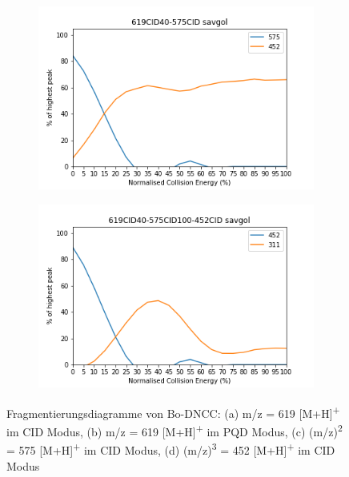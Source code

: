 \begin{figure}[!htbp]
  \begin{subfigure}[b]{0.5\textwidth}
    \includegraphics[width=\textwidth]{content/Anhang/ESIMS/Bo-DNCC/619CID40-575CID-575savgol.png}
    \caption{}
  \end{subfigure}
  \hfill
  \begin{subfigure}[b]{0.5\textwidth}
    \includegraphics[width=\textwidth]{content/Anhang/ESIMS/Bo-DNCC/619CID40-575CID100-452CID-452savgol.png}
    \caption{}
  \end{subfigure}
  
  \caption[Fragmentierungsdiagramme von Bo-DNCC, Quelle: Autor]{Fragmentierungsdiagramme von Bo-DNCC: (a) m/z = 619 [M+H]\textsuperscript{+} im CID Modus, (b) m/z = 619 [M+H]\textsuperscript{+} im PQD Modus, (c) (m/z)\textsuperscript{2} = 575 [M+H]\textsuperscript{+} im CID Modus, (d) (m/z)\textsuperscript{3} = 452 [M+H]\textsuperscript{+} im CID Modus }
\end{figure}

